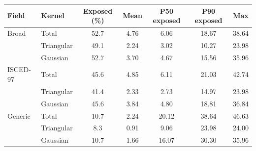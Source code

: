 \begin{tabular}{llccccc}
\toprule
Field & Kernel & Exposed (\%) & Mean & P50 exposed & P90 exposed & Max \\
\midrule
Broad & Total & 52.7 &  4.76 &  6.06 & 18.67 & 38.64 \\
 & Triangular & 49.1 &  2.24 &  3.02 & 10.27 & 23.98 \\
 & Gaussian & 52.7 &  3.70 &  4.67 & 15.56 & 35.96 \\
ISCED-97 & Total & 45.6 &  4.85 &  6.11 & 21.03 & 42.74 \\
 & Triangular & 41.4 &  2.33 &  2.73 & 14.97 & 23.98 \\
 & Gaussian & 45.6 &  3.84 &  4.80 & 18.81 & 36.84 \\
Generic & Total & 10.7 &  2.24 & 20.12 & 38.64 & 46.63 \\
 & Triangular &  8.3 &  0.91 &  9.06 & 23.98 & 24.00 \\
 & Gaussian & 10.7 &  1.66 & 16.07 & 30.30 & 35.96 \\
\bottomrule
\end{tabular}

